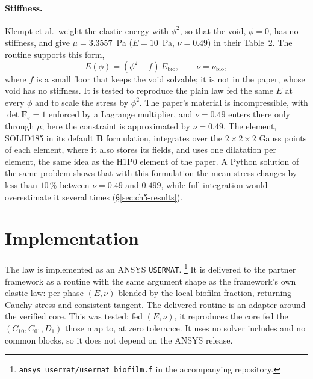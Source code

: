\paragraph{Stiffness.} Klempt et al.\ weight the elastic energy with
$\phi^2$, so that the void, $\phi=0$, has no stiffness, and give
$\mu=3.3557$~Pa ($E=10$~Pa, $\nu=0.49$) in their Table~2. The routine
supports this form,
\begin{equation}
  E(\phi) = (\phi^2+f)\,E_{\mathrm{bio}},\qquad \nu=\nu_{\mathrm{bio}},
  \label{eq:ch5-stiffness}
\end{equation}
where $f$ is a small floor that keeps the void solvable; it is not in the
paper, whose void has no stiffness. It is tested to
reproduce the plain law fed the same $E$ at every $\phi$ and to scale the
stress by $\phi^2$. The paper's material is incompressible, with $\det\mathbf F_e=1$ enforced by
a Lagrange multiplier, and $\nu=0.49$ enters there only through $\mu$; here
the constraint is approximated by $\nu=0.49$. The element, SOLID185 in its default
$\bar{\mathbf B}$ formulation, integrates over the $2\times2\times2$ Gauss points
of each element, where it also stores its fields, and uses one dilatation per
element, the same idea as the H1P0 element of the paper. A Python solution of the same problem shows
that with this formulation the mean stress changes by less than $10\,\%$
between $\nu=0.49$ and $0.499$, while full integration would overestimate it
several times (\S\ref{sec:ch5-results}).

\section{Implementation}
\label{sec:ch5-impl}

The law is implemented as an ANSYS \texttt{USERMAT}.%
\footnote{\texttt{ansys\_usermat/usermat\_biofilm.f} in the accompanying
repository.}
It is delivered to the partner framework as a routine with the same argument
shape as the framework's own elastic law: per-phase $(E,\nu)$ blended by the
local biofilm fraction, returning Cauchy stress and consistent tangent. The
delivered routine is an adapter around the verified core. This was tested:
fed $(E,\nu)$, it reproduces the core fed the
$(C_{10},C_{01},D_1)$ those map to, at zero tolerance. It uses no solver
includes and no common blocks, so it does not depend on the ANSYS release.

